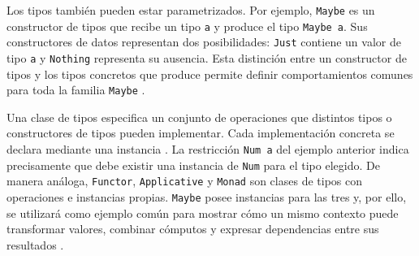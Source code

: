 Los tipos también pueden estar parametrizados. Por ejemplo, \texttt{Maybe} es un constructor de tipos que recibe un tipo \verb|a| y produce el tipo \texttt{Maybe a}. Sus constructores de datos representan dos posibilidades: \texttt{Just} contiene un valor de tipo \verb|a| y \texttt{Nothing} representa su ausencia. Esta distinción entre un constructor de tipos y los tipos concretos que produce permite definir comportamientos comunes para toda la familia \texttt{Maybe} \cite[secciones~4.1.2 y~6.1.8; capítulo~21]{Haskell2010}.

Una clase de tipos especifica un conjunto de operaciones que distintos tipos o constructores de tipos pueden implementar. Cada implementación concreta se declara mediante una instancia \cite[secciones~4.1 y~4.3]{Haskell2010}. La restricción \verb|Num a| del ejemplo anterior indica precisamente que debe existir una instancia de \texttt{Num} para el tipo elegido. De manera análoga, \texttt{Functor}, \texttt{Applicative} y \texttt{Monad} son clases de tipos con operaciones e instancias propias. \texttt{Maybe} posee instancias para las tres y, por ello, se utilizará como ejemplo común para mostrar cómo un mismo contexto puede transformar valores, combinar cómputos y expresar dependencias entre sus resultados \cite{Yorgey2009,GHCInternalBase}.

